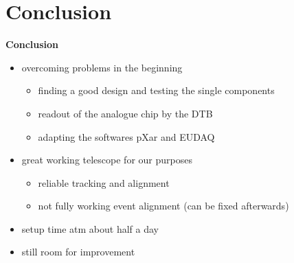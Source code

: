 \documentclass[9pt]{beamer}
\begin{document}
\section{Conclusion}
\begin{frame}
	\begin{alertblock}{
		\begin{center}
			\Large{\textbf{Conclusion}}
		\end{center}}
	\end{alertblock}
\end{frame}
\begin{frame}
	\begin{itemize}
		\vfill\item overcoming problems in the beginning
		\begin{itemize}
			\item finding a good design and testing the single components
			\item readout of the analogue chip by the DTB 
			\item adapting the softwares pXar and EUDAQ
		\end{itemize}
		\vfill\item great working telescope for our purposes
		\begin{itemize}
			\item reliable tracking and alignment
			\item not fully working event alignment (can be fixed afterwards)
		\end{itemize}
		\vfill\item setup time atm about half a day
		\vfill\item still room for improvement
	\end{itemize}
\end{frame}
\end{document}
